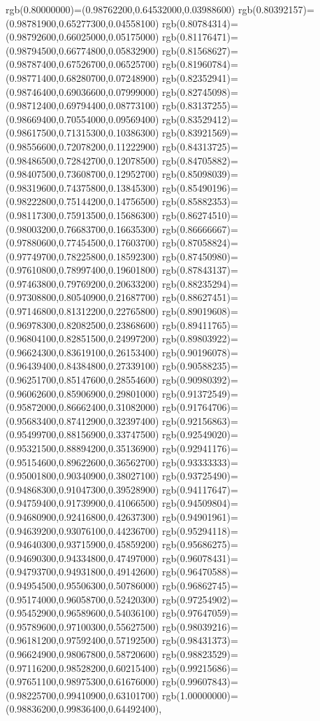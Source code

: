 {{rgb(0.80000000)=(0.98762200,0.64532000,0.03988600)
rgb(0.80392157)=(0.98781900,0.65277300,0.04558100)
rgb(0.80784314)=(0.98792600,0.66025000,0.05175000)
rgb(0.81176471)=(0.98794500,0.66774800,0.05832900)
rgb(0.81568627)=(0.98787400,0.67526700,0.06525700)
rgb(0.81960784)=(0.98771400,0.68280700,0.07248900)
rgb(0.82352941)=(0.98746400,0.69036600,0.07999000)
rgb(0.82745098)=(0.98712400,0.69794400,0.08773100)
rgb(0.83137255)=(0.98669400,0.70554000,0.09569400)
rgb(0.83529412)=(0.98617500,0.71315300,0.10386300)
rgb(0.83921569)=(0.98556600,0.72078200,0.11222900)
rgb(0.84313725)=(0.98486500,0.72842700,0.12078500)
rgb(0.84705882)=(0.98407500,0.73608700,0.12952700)
rgb(0.85098039)=(0.98319600,0.74375800,0.13845300)
rgb(0.85490196)=(0.98222800,0.75144200,0.14756500)
rgb(0.85882353)=(0.98117300,0.75913500,0.15686300)
rgb(0.86274510)=(0.98003200,0.76683700,0.16635300)
rgb(0.86666667)=(0.97880600,0.77454500,0.17603700)
rgb(0.87058824)=(0.97749700,0.78225800,0.18592300)
rgb(0.87450980)=(0.97610800,0.78997400,0.19601800)
rgb(0.87843137)=(0.97463800,0.79769200,0.20633200)
rgb(0.88235294)=(0.97308800,0.80540900,0.21687700)
rgb(0.88627451)=(0.97146800,0.81312200,0.22765800)
rgb(0.89019608)=(0.96978300,0.82082500,0.23868600)
rgb(0.89411765)=(0.96804100,0.82851500,0.24997200)
rgb(0.89803922)=(0.96624300,0.83619100,0.26153400)
rgb(0.90196078)=(0.96439400,0.84384800,0.27339100)
rgb(0.90588235)=(0.96251700,0.85147600,0.28554600)
rgb(0.90980392)=(0.96062600,0.85906900,0.29801000)
rgb(0.91372549)=(0.95872000,0.86662400,0.31082000)
rgb(0.91764706)=(0.95683400,0.87412900,0.32397400)
rgb(0.92156863)=(0.95499700,0.88156900,0.33747500)
rgb(0.92549020)=(0.95321500,0.88894200,0.35136900)
rgb(0.92941176)=(0.95154600,0.89622600,0.36562700)
rgb(0.93333333)=(0.95001800,0.90340900,0.38027100)
rgb(0.93725490)=(0.94868300,0.91047300,0.39528900)
rgb(0.94117647)=(0.94759400,0.91739900,0.41066500)
rgb(0.94509804)=(0.94680900,0.92416800,0.42637300)
rgb(0.94901961)=(0.94639200,0.93076100,0.44236700)
rgb(0.95294118)=(0.94640300,0.93715900,0.45859200)
rgb(0.95686275)=(0.94690300,0.94334800,0.47497000)
rgb(0.96078431)=(0.94793700,0.94931800,0.49142600)
rgb(0.96470588)=(0.94954500,0.95506300,0.50786000)
rgb(0.96862745)=(0.95174000,0.96058700,0.52420300)
rgb(0.97254902)=(0.95452900,0.96589600,0.54036100)
rgb(0.97647059)=(0.95789600,0.97100300,0.55627500)
rgb(0.98039216)=(0.96181200,0.97592400,0.57192500)
rgb(0.98431373)=(0.96624900,0.98067800,0.58720600)
rgb(0.98823529)=(0.97116200,0.98528200,0.60215400)
rgb(0.99215686)=(0.97651100,0.98975300,0.61676000)
rgb(0.99607843)=(0.98225700,0.99410900,0.63101700)
rgb(1.00000000)=(0.98836200,0.99836400,0.64492400)},
}